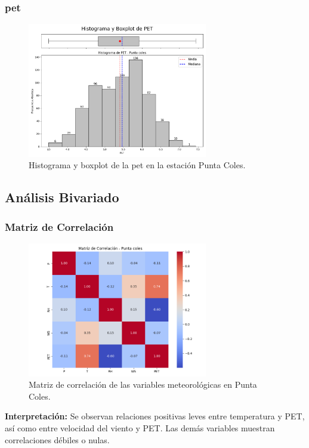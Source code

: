 \subsubsection*{\gls{pet} }
\begin{figure}[htbp]
\centering
\includegraphics[width=0.7\textwidth]{resultados/por_estacion_meteorologica/Punta_Coles/PET_histograma.png}
\caption{Histograma y boxplot de la \gls{pet}  en la estación Punta Coles.}
\label{fig:punta_coles_PET}
\end{figure}

\subsection{Análisis Bivariado}

\subsubsection*{Matriz de Correlación}
\begin{figure}[htbp]
\centering
\includegraphics[width=0.7\textwidth]{resultados/por_estacion_meteorologica/Punta_Coles/matriz_correlacion.png}
\caption{Matriz de correlación de las variables meteorológicas en Punta Coles.}
\label{fig:punta_coles_corr}
\end{figure}
\textbf{Interpretación:} Se observan relaciones positivas leves entre temperatura y PET, así como entre velocidad del viento y PET. Las demás variables muestran correlaciones débiles o nulas.

